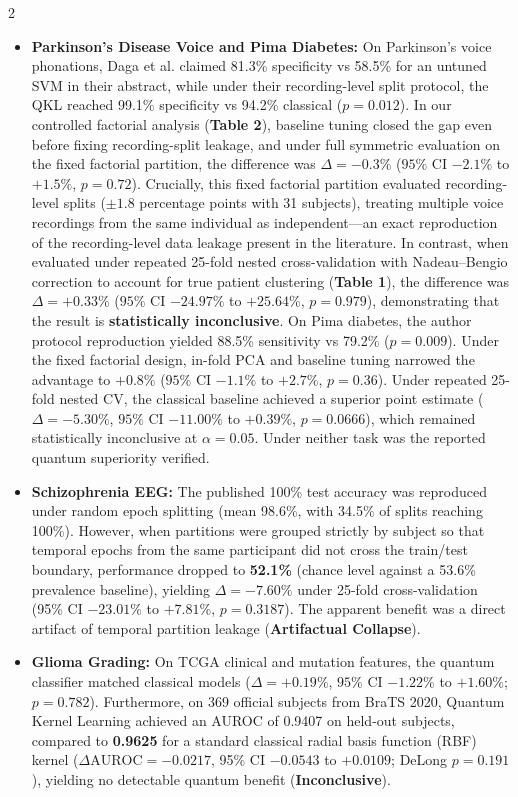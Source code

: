 \documentclass[10pt,a4paper,twoside]{article}
\begin{document}
\begin{multicols}{2}
\begin{itemize}
  \item \textbf{Parkinson's Disease Voice and Pima Diabetes:} On Parkinson's voice phonations, Daga et al. \cite{daga2026} claimed 81.3\% specificity vs 58.5\% for an untuned SVM in their abstract, while under their recording-level split protocol, the QKL reached 99.1\% specificity vs 94.2\% classical ($p = 0.012$). In our controlled factorial analysis (\textbf{Table 2}), baseline tuning closed the gap even before fixing recording-split leakage, and under full symmetric evaluation on the fixed factorial partition, the difference was $\Delta = -0.3\%$ ($95\%$ CI $-2.1\%$ to $+1.5\%$, $p = 0.72$). Crucially, this fixed factorial partition evaluated recording-level splits ($\pm 1.8$ percentage points with 31 subjects), treating multiple voice recordings from the same individual as independent---an exact reproduction of the recording-level data leakage present in the literature. In contrast, when evaluated under repeated 25-fold nested cross-validation with Nadeau--Bengio correction to account for true patient clustering (\textbf{Table 1}), the difference was $\Delta = +0.33\%$ ($95\%$ CI $-24.97\%$ to $+25.64\%$, $p = 0.979$), demonstrating that the result is \textbf{statistically inconclusive}. On Pima diabetes, the author protocol reproduction yielded 88.5\% sensitivity vs 79.2\% ($p = 0.009$). Under the fixed factorial design, in-fold PCA and baseline tuning narrowed the advantage to $+0.8\%$ ($95\%$ CI $-1.1\%$ to $+2.7\%$, $p = 0.36$). Under repeated 25-fold nested CV, the classical baseline achieved a superior point estimate ($\Delta = -5.30\%$, $95\%$ CI $-11.00\%$ to $+0.39\%$, $p = 0.0666$), which remained statistically inconclusive at $\alpha = 0.05$. Under neither task was the reported quantum superiority verified.
  \item \textbf{Schizophrenia EEG:} The published 100\% test accuracy was reproduced under random epoch splitting (mean 98.6\%, with 34.5\% of splits reaching 100\%). However, when partitions were grouped strictly by subject so that temporal epochs from the same participant did not cross the train/test boundary, performance dropped to \textbf{52.1\%} (chance level against a 53.6\% prevalence baseline), yielding $\Delta = -7.60\%$ under 25-fold cross-validation (95\% CI $-23.01\%$ to $+7.81\%$, $p = 0.3187$). The apparent benefit was a direct artifact of temporal partition leakage (\textbf{Artifactual Collapse}).
  \item \textbf{Glioma Grading:} On TCGA clinical and mutation features, the quantum classifier matched classical models ($\Delta = +0.19\%$, $95\%$ CI $-1.22\%$ to $+1.60\%$; $p = 0.782$). Furthermore, on 369 official subjects from BraTS 2020, Quantum Kernel Learning achieved an AUROC of 0.9407 on held-out subjects, compared to \textbf{0.9625} for a standard classical radial basis function (RBF) kernel ($\Delta\text{AUROC} = -0.0217$, 95\% CI $-0.0543$ to $+0.0109$; DeLong $p = 0.191$ \cite{delong1988}), yielding no detectable quantum benefit (\textbf{Inconclusive}).

\end{itemize}
\end{multicols}
\end{document}
